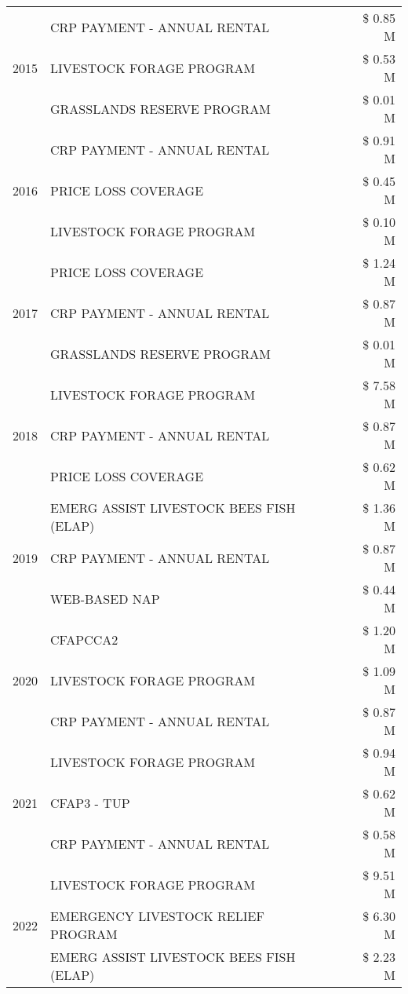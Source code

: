 \begin{tabular}{llr}
\cline{1-3}
\multirow[t]{3}{*}{2015} & CRP PAYMENT - ANNUAL RENTAL & \$ 0.85 M \\
 & LIVESTOCK FORAGE PROGRAM & \$ 0.53 M \\
 & GRASSLANDS RESERVE PROGRAM & \$ 0.01 M \\
\cline{1-3}
\multirow[t]{3}{*}{2016} & CRP PAYMENT - ANNUAL RENTAL & \$ 0.91 M \\
 & PRICE LOSS COVERAGE & \$ 0.45 M \\
 & LIVESTOCK FORAGE PROGRAM & \$ 0.10 M \\
\cline{1-3}
\multirow[t]{3}{*}{2017} & PRICE LOSS COVERAGE & \$ 1.24 M \\
 & CRP PAYMENT - ANNUAL RENTAL & \$ 0.87 M \\
 & GRASSLANDS RESERVE PROGRAM & \$ 0.01 M \\
\cline{1-3}
\multirow[t]{3}{*}{2018} & LIVESTOCK FORAGE PROGRAM & \$ 7.58 M \\
 & CRP PAYMENT - ANNUAL RENTAL & \$ 0.87 M \\
 & PRICE LOSS COVERAGE & \$ 0.62 M \\
\cline{1-3}
\multirow[t]{3}{*}{2019} & EMERG ASSIST LIVESTOCK BEES FISH (ELAP) & \$ 1.36 M \\
 & CRP PAYMENT - ANNUAL RENTAL & \$ 0.87 M \\
 & WEB-BASED NAP & \$ 0.44 M \\
\cline{1-3}
\multirow[t]{3}{*}{2020} & CFAPCCA2 & \$ 1.20 M \\
 & LIVESTOCK FORAGE PROGRAM & \$ 1.09 M \\
 & CRP PAYMENT - ANNUAL RENTAL & \$ 0.87 M \\
\cline{1-3}
\multirow[t]{3}{*}{2021} & LIVESTOCK FORAGE PROGRAM & \$ 0.94 M \\
 & CFAP3 - TUP & \$ 0.62 M \\
 & CRP PAYMENT - ANNUAL RENTAL & \$ 0.58 M \\
\cline{1-3}
\multirow[t]{3}{*}{2022} & LIVESTOCK FORAGE PROGRAM & \$ 9.51 M \\
 & EMERGENCY LIVESTOCK RELIEF PROGRAM & \$ 6.30 M \\
 & EMERG ASSIST LIVESTOCK BEES FISH (ELAP) & \$ 2.23 M \\
\cline{1-3}
\bottomrule
\end{tabular}
